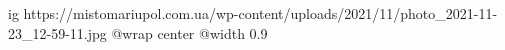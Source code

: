  
 
 
 
 

\ifcmt
  ig https://mistomariupol.com.ua/wp-content/uploads/2021/11/photo_2021-11-23_12-59-11.jpg
  @wrap center
  @width 0.9
\fi
